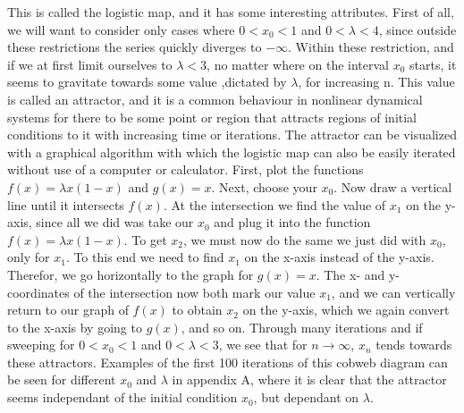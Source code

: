 \documentclass[12pt,oneside,a4paper]{article}
\numberwithin{equation}{section}
\begin{document}
{{{{This is called the logistic map, and it has some interesting attributes. First of all, we will want to consider only cases where $0<x_0<1$ and $0<\lambda<4$, since outside these restrictions the series quickly diverges to $-\infty$. Within these restriction, and if we at first limit ourselves to $\lambda<3$, no matter where on the interval $x_0$ starts, it seems to gravitate towards some value ,dictated by $\lambda$, for increasing n. This value is called an attractor, and it is a common behaviour in nonlinear dynamical systems for there to be some point or region that attracts regions of initial conditions to it with increasing time or iterations. The attractor can be visualized with a graphical algorithm with which the logistic map can also be easily iterated without use of a computer or calculator. First, plot the functions $f(x)=\lambda x (1-x)$ and $g(x)=x$. Next, choose your $x_0$. Now draw a vertical line until it intersects $f(x)$. At the intersection we find the value of $x_1$ on the y-axis, since all we did was take our $x_0$ and plug it into the function $f(x)=\lambda x (1-x)$. To get $x_2$, we must now do the same we just did with $x_0$, only for $x_1$. To this end we need to find $x_1$ on the x-axis instead of the y-axis. Therefor, we go horizontally to the graph for $g(x)=x$. The x- and y-coordinates of the intersection now both mark our value $x_1$, and we can vertically return to our graph of $f(x)$ to obtain $x_2$ on the y-axis, which we again convert to the x-axis by going to $g(x)$, and so on. Through many iterations and if sweeping for $0<x_0<1$ and $0<\lambda<3$, we see that for $n\to \infty$, $x_n$ tends towards these attractors. Examples of the first 100 iterations of this cobweb diagram can be seen for different $x_0$ and $\lambda$ in appendix A, where it is clear that the attractor seems independant of the initial condition $x_0$, but dependant on $\lambda$.

}}}}
\end{document}
